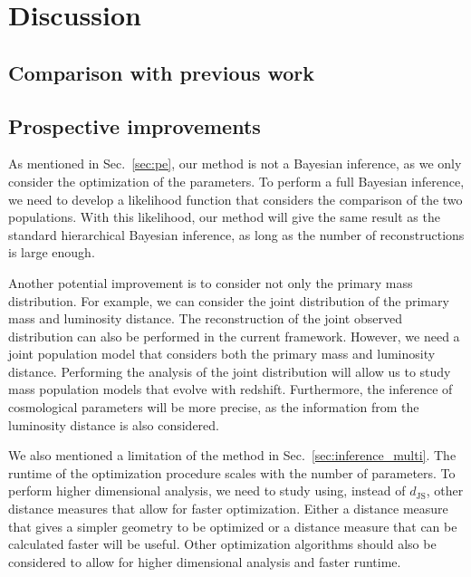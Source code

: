 \documentclass[twocolumn]{aastex631}
\begin{document}


\section{Discussion}
\label{sec:discussion}

\subsection{Comparison with previous work}
\label{sec:comparison}

\subsection{Prospective improvements}
\label{sec:prospective}
As mentioned in Sec.~\ref{sec:pe}, our method is not a Bayesian inference, as we only consider the optimization of the parameters.
To perform a full Bayesian inference, we need to develop a likelihood function that considers the comparison of the two populations.
With this likelihood, our method will give the same result as the standard hierarchical Bayesian inference, as long as the number of reconstructions is large enough.

Another potential improvement is to consider not only the primary mass distribution.
For example, we can consider the joint distribution of the primary mass and luminosity distance.
The reconstruction of the joint observed distribution can also be performed in the current framework.
However, we need a joint population model that considers both the primary mass and luminosity distance.
Performing the analysis of the joint distribution will allow us to study mass population models that evolve with redshift.
Furthermore, the inference of cosmological parameters will be more precise, as the information from the luminosity distance is also considered.

We also mentioned a limitation of the method in Sec.~\ref{sec:inference_multi}.
The runtime of the optimization procedure scales with the number of parameters.
To perform higher dimensional analysis, we need to study using, instead of $d_\mathrm{JS}$, other distance measures that allow for faster optimization.
Either a distance measure that gives a simpler geometry to be optimized or a distance measure that can be calculated faster will be useful.
Other optimization algorithms should also be considered to allow for higher dimensional analysis and faster runtime.
\end{document}
